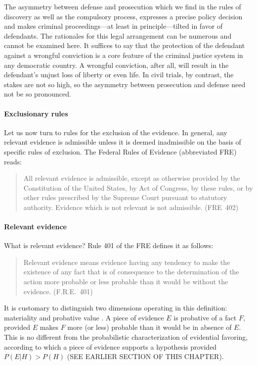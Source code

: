 \documentclass[10pt]{article}
\begin{document}
The asymmetry between defense and prosecution which we find in the rules of discovery as well as the compulsory process, 
expresses a precise policy decision and makes criminal proceedings---at least in principle---tilted 
in favor of defendants. The rationales for this legal arrangement  can be numerous and cannot be examined here. 
It suffices to say that the protection of the defendant against a wrongful conviction is a core 
feature of the criminal justice system in any democratic country. A wrongful conviction, after all, will result 
 in the defendant's unjust loss of liberty or even life. In civil trials, by contrast, the stakes are not so high, 
so the asymmetry between prosecution and defense need not be so pronounced.



\paragraph{Exclusionary rules}

Let us now turn to rules for the exclusion of the evidence. In general, any relevant evidence is admissible 
unless it is deemed inadmissible on the basis of specific rules of exclusion. %
The Federal Rules of Evidence (abbreviated FRE) reads:
%
\begin{quote}
\begin{singlespace}
All relevant evidence is admissible, except as otherwise provided by the Constitution of the United States, by Act of Congress, by these rules, or by other rules prescribed by the Supreme Court pursuant to statutory authority. Evidence which is not relevant is not admissible. (FRE\ 402)
\end{singlespace}
\end{quote}
%

\paragraph{Relevant evidence}
What is relevant evidence? 
Rule 401 of the FRE defines it as follows:
%
\begin{quote}
\begin{singlespace}
Relevant evidence means evidence having any tendency to make the existence of any fact that is of consequence to the determination of the action more probable or less probable than it would be without the evidence. (F.R.E.\ 401)
\end{singlespace}
\end{quote}
%
It is customary to distinguish two dimensions operating in this definition: materiality and probative value \citep{Fisher2008Evidence, Mendez2008}. A piece of evidence $E$ is probative of a fact $F$, provided $E$ makes $F$ more (or less) probable than it would be in absence of $E$. This is no different from the probabilistic characterization of 
evidential favoring, according to which a piece of evidence supports a hypothesis provided $P(E|H)> P(H)$ (SEE EARLIER SECTION OF THIS CHAPTER). 
\end{document}
